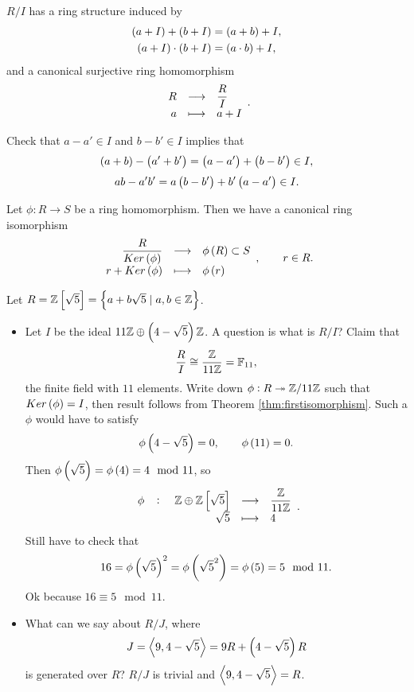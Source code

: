 \begin{proposition}
$ R / I $ has a ring structure induced by
\begin{align*}
\br{a + I} + \br{b + I} & = \br{a + b} + I, \\
\br{a + I} \cdot \br{b + I} & = \br{a \cdot b} + I,
\end{align*}
and a canonical surjective ring homomorphism
$$ \function{R}{\dfrac{R}{I}}{a}{a + I}. $$
\end{proposition}

Check that $ a - a' \in I $ and $ b - b' \in I $ implies that
$$ \br{a + b} - \br{a' + b'} = \br{a - a'} + \br{b - b'} \in I, $$
$$ ab - a'b' = a\br{b - b'} + b'\br{a - a'} \in I. $$

\begin{theorem}
\label{thm:firstisomorphism}
Let $ \phi : R \to S $ be a ring homomorphism. Then we have a canonical ring isomorphism
$$ \function{\dfrac{R}{Ker\br{\phi}}}{\phi\br{R} \subset S}{r + Ker\br{\phi}}{\phi\br{r}}, \qquad r \in R. $$
\end{theorem}

\pagebreak

\begin{example*}
Let $ R = \Z\sbr{\sqrt{5}} = \cbr{a + b\sqrt{5} \mid a, b \in \Z} $.
\begin{itemize}
\item Let $ I $ be the ideal $ 11\Z \oplus \br{4 - \sqrt{5}}\Z $. A question is what is $ R / I $? Claim that
$$ \dfrac{R}{I} \cong \dfrac{\mathbb{Z}}{11\mathbb{Z}} = \mathbb{F}_{11}, $$
the finite field with $ 11 $ elements. Write down $ \phi : R \twoheadrightarrow \mathbb{Z} / 11\mathbb{Z} $ such that $ Ker\br{\phi} = I $, then result follows from Theorem \ref{thm:firstisomorphism}. Such a $ \phi $ would have to satisfy
$$ \phi\br{4 - \sqrt{5}} = 0, \qquad \phi\br{11} = 0. $$
Then $ \phi\br{\sqrt{5}} = \phi\br{4} = 4 \mod 11 $, so
$$ \function[\phi]{\Z \oplus \Z\sbr{\sqrt{5}}}{\dfrac{\Z}{11\Z}}{\sqrt{5}}{4}. $$
Still have to check that
$$ 16 = \phi\br{\sqrt{5}}^2 = \phi\br{\sqrt{5}^2} = \phi\br{5} = 5 \mod 11. $$
Ok because $ 16 \equiv 5 \mod 11 $.
\item What can we say about $ R / J $, where
$$ J = \abr{9, 4 - \sqrt{5}} = 9R + \br{4 - \sqrt{5}}R $$
is generated over $ R $? $ R / J $ is trivial and $ \left\langle 9, 4 - \sqrt{5} \right\rangle = R $.
\end{itemize}
\end{example*}

